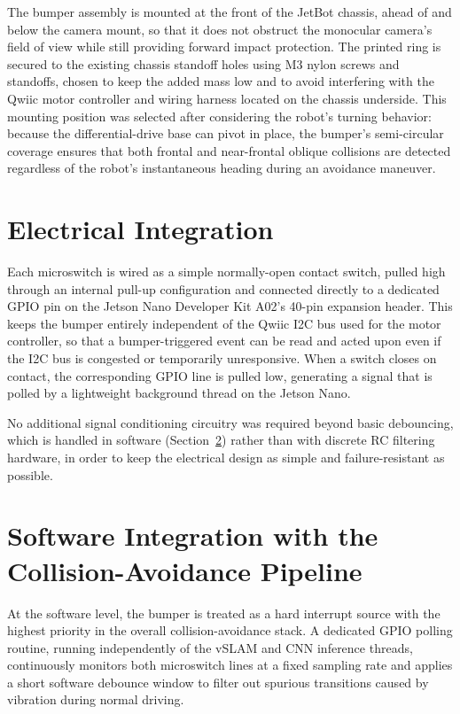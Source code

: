 The bumper assembly is mounted at the front of the JetBot chassis, ahead of and below the camera mount, so that it does not obstruct the monocular camera's field of view while still providing forward impact protection. The printed ring is secured to the existing chassis standoff holes using M3 nylon screws and standoffs, chosen to keep the added mass low and to avoid interfering with the Qwiic motor controller and wiring harness located on the chassis underside. This mounting position was selected after considering the robot's turning behavior: because the differential-drive base can pivot in place, the bumper's semi-circular coverage ensures that both frontal and near-frontal oblique collisions are detected regardless of the robot's instantaneous heading during an avoidance maneuver.

\section{Electrical Integration}
\label{sec:bumper-electrical}

Each microswitch is wired as a simple normally-open contact switch, pulled high through an internal pull-up configuration and connected directly to a dedicated GPIO pin on the Jetson Nano Developer Kit A02's 40-pin expansion header. This keeps the bumper entirely independent of the Qwiic I2C bus used for the motor controller, so that a bumper-triggered event can be read and acted upon even if the I2C bus is congested or temporarily unresponsive. When a switch closes on contact, the corresponding GPIO line is pulled low, generating a signal that is polled by a lightweight background thread on the Jetson Nano.

No additional signal conditioning circuitry was required beyond basic debouncing, which is handled in software (Section~\ref{sec:bumper-software}) rather than with discrete RC filtering hardware, in order to keep the electrical design as simple and failure-resistant as possible.

\section{Software Integration with the Collision-Avoidance Pipeline}
\label{sec:bumper-software}

At the software level, the bumper is treated as a hard interrupt source with the highest priority in the overall collision-avoidance stack. A dedicated GPIO polling routine, running independently of the vSLAM and CNN inference threads, continuously monitors both microswitch lines at a fixed sampling rate and applies a short software debounce window to filter out spurious transitions caused by vibration during normal driving.

